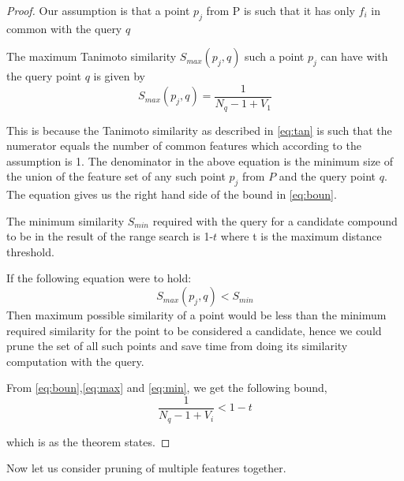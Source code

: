 \begin{proof}
\label{proof1}
Our assumption is that a point $p_j$ from P is such that it has only $f_i$ in common with the query $q$  
 
The maximum Tanimoto similarity $S_{max}(p_j,q)$ such a point $p_j$ can have with the query point $q$ is given by
\begin{equation}
\label{eq:max}
S_{max}(p_j,q)=\frac{1}{N_q - 1 + V_{1}}
\end{equation}

This is because the Tanimoto similarity as described in \autoref{eq:tan} is such that the numerator equals the number of common features which according to the assumption is 1. The denominator in the above equation is the minimum size of the union of the feature set of any such point $p_j$ from $P$ and the query point $q$.
The equation gives us the right hand side of the bound 
in \autoref{eq:boun}. 

The minimum similarity $S_{min}$ required with the query for a candidate compound to be in the result of the range search is 1-$t$ where t is the maximum distance threshold.

If the following equation were to hold:
\begin{equation}
\label{eq:min}
	S_{max}(p_j,q) < S_{min}
\end{equation}
Then maximum possible similarity of a point would be less than the minimum required similarity for the point to be considered a candidate, hence we could prune the set of all such points and save time from doing its similarity computation with the query. 

From \autoref{eq:boun},\autoref{eq:max} and \autoref{eq:min}, we get the following bound,
\begin{equation}
\frac{1}{N_q - 1 + V_{i}}  < 1-t
\end{equation}

which is as the theorem states.

\end{proof}


Now let us consider pruning of multiple features together. 


